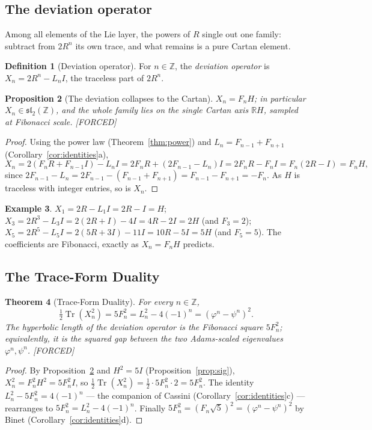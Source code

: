 \documentclass[11pt]{article}
\theoremstyle{plain}
\newtheorem{theorem}{Theorem}[section]
\newtheorem{proposition}[theorem]{Proposition}
\theoremstyle{definition}
\newtheorem{definition}[theorem]{Definition}
\newtheorem{example}[theorem]{Example}
\theoremstyle{remark}
\newcommand{\Forced}{\textcolor{forcedc}{[FORCED]}}
\newcommand{\Tr}{\operatorname{Tr}}
\begin{document}
\subsection{The deviation operator}

Among all elements of the Lie layer, the powers of $R$ single out one family: subtract from $2R^{n}$ its own trace, and what remains is a pure Cartan element.

\begin{definition}[Deviation operator]\label{def:deviation}
For $n∈ℤ$, the \emph{deviation operator} is $X_n=2R^{n}-L_nI$, the traceless part of $2R^{n}$.
\end{definition}

\begin{proposition}[The deviation collapses to the Cartan]\label{prop:deviation}
$X_n=F_nH$; in particular $X_n∈𝔰𝔩_2(ℤ)$, and the whole family lies on the single Cartan axis $ℝH$, sampled at Fibonacci scale. \Forced
\end{proposition}
\begin{proof}
Using the power law (Theorem~\ref{thm:power}) and $L_n=F_{n-1}+F_{n+1}$ (Corollary~\ref{cor:identities}a),
\[
X_n=2(F_nR+F_{n-1}I)-L_nI=2F_nR+(2F_{n-1}-L_n)I=2F_nR-F_nI=F_n(2R-I)=F_nH,
\]
since $2F_{n-1}-L_n=2F_{n-1}-(F_{n-1}+F_{n+1})=F_{n-1}-F_{n+1}=-F_n$. As $H$ is traceless with integer entries, so is $X_n$.
\end{proof}

\begin{example}\label{ex:deviation}
$X_1=2R-L_1I=2R-I=H$; \ $X_3=2R^{3}-L_3I=2(2R+I)-4I=4R-2I=2H$ (and $F_3=2$); \ $X_5=2R^{5}-L_5I=2(5R+3I)-11I=10R-5I=5H$ (and $F_5=5$). The coefficients are Fibonacci, exactly as $X_n=F_nH$ predicts.
\end{example}

\subsection{The Trace-Form Duality}

\begin{theorem}[Trace-Form Duality]\label{thm:duality}
For every $n∈ℤ$,
\[
\tfrac12\Tr(X_n^{2})=5F_n^{2}=L_n^{2}-4(-1)^{n}=(φ^{n}-ψ^{n})^{2}.
\]
The hyperbolic length of the deviation operator is the Fibonacci square $5F_n^{2}$; equivalently, it is the squared gap between the two Adams-scaled eigenvalues $φ^{n},ψ^{n}$. \Forced
\end{theorem}
\begin{proof}
By Proposition~\ref{prop:deviation} and $H^{2}=5I$ (Proposition~\ref{prop:sig}), $X_n^{2}=F_n^{2}H^{2}=5F_n^{2}I$, so $\tfrac12\Tr(X_n^{2})=\tfrac12\cdot5F_n^{2}\cdot2=5F_n^{2}$. The identity $L_n^{2}-5F_n^{2}=4(-1)^{n}$ --- the companion of Cassini (Corollary~\ref{cor:identities}c) --- rearranges to $5F_n^{2}=L_n^{2}-4(-1)^{n}$. Finally $5F_n^{2}=(F_n\sqrt5)^{2}=(φ^{n}-ψ^{n})^{2}$ by Binet (Corollary~\ref{cor:identities}d).
\end{proof}
\end{document}
